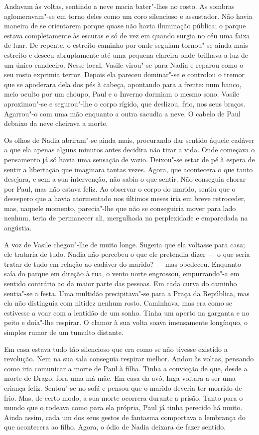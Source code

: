Andavam às voltas, sentindo a neve macia bater"-lhes no rosto. As sombras
aglomeravam"-se em torno deles como um coro silencioso e assustador. Não
havia maneira de se orientarem porque quase não havia iluminação
pública; o parque estava completamente às escuras e só de vez em quando
surgia no céu uma faixa de luar. De repente, o estreito caminho por onde seguiam tornou"-se ainda mais estreito e desceu
abruptamente até uma pequena clareira onde brilhava a luz de um único
candeeiro. Nesse local, Vasile virou"-se para Nadia e reparou como o seu
rosto exprimia terror. Depois ela pareceu dominar"-se e controlou o
tremor que se apoderara dela dos pés à cabeça, apontando para a
frente: num banco, meio oculto por um choupo, Paul e o Inverno dormiam o
mesmo sono. Vasile aproximou"-se e segurou"-lhe o corpo rígido, que
deslizou, frio, nos seus braços. Agarrou"-o com uma mão enquanto a outra
sacudia a neve. O cabelo de Paul debaixo da neve cheirava a morte.

Os olhos de Nadia abriram"-se ainda mais, procurando dar sentido àquele
cadáver a que ela apenas alguns minutos antes decidira não tirar a
vida. Onde começava o pensamento já só havia uma sensação de vazio.
Deixou"-se estar de pé à espera de sentir a libertação que imaginara
tantas vezes. Agora, que acontecera o que tanto desejara, e sem a sua
intervenção, não sabia o que sentir. Não conseguia chorar por Paul,
mas não estava feliz. Ao observar o corpo do marido, sentiu que o
desespero que a havia atormentado nos últimos meses iria em breve
retroceder, mas, naquele momento, parecia"-lhe que não se conseguiria
mover para lado nenhum, teria de permanecer ali, mergulhada na
perplexidade e emparedada na angústia.

A voz de Vasile chegou"-lhe de muito longe. Sugeria que
ela voltasse para casa; ele trataria de tudo. Nadia não percebeu o que
ele pretendia dizer --- o que seria tratar de tudo em relação ao cadáver
do marido? --- mas obedeceu. Enquanto saía do parque em direção à rua, o
vento norte
engrossou, empurrando"-a em sentido contrário ao da maior parte das
pessoas. Em cada curva do caminho sentia"-se a festa. Uma multidão
precipitava"-se para a Praça da República, mas ela não distinguia com
nitidez nenhum rosto. Caminhava, mas era como se estivesse a voar com a
lentidão de um sonho. Tinha um aperto na garganta e no peito e
doía"-lhe respirar. O clamor à sua volta soava imensamente longínquo, o
simples rumor de um tumulto distante.

Em casa estava tudo tão silencioso que era como se não tivesse existido
a revolução. Nem na sua sala conseguia respirar melhor. Andou às voltas,
pensando como iria comunicar a morte de Paul à filha. Tinha a convicção
de que, desde a morte de Drago, fora uma má mãe. Em casa da avó, Inga
voltara a ser uma criança feliz. Sentou"-se no sofá e pensou que o marido
deveria ter morrido de frio. Mas, de certo modo, a sua morte ocorrera
durante a prisão. Tanto para o mundo que o rodeava como para ela
própria, Paul já tinha perecido há muito. Ainda assim, cada um dos seus
gestos de fantasma comportava a lembrança do que acontecera ao filho.
Agora, o ódio de Nadia deixara de fazer sentido.


